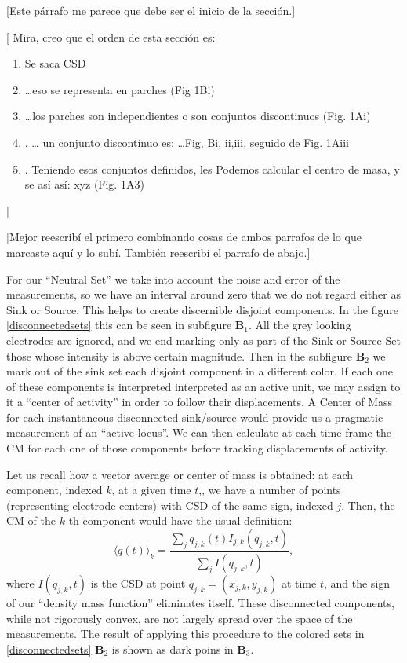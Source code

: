 \documentclass[letterpaper,12pts]{article}
\newcommand{\komment}[1]{{\color{red} [#1]}}
\newcommand{\romment}[1]{{\color{blue} [#1]}}
\newcommand{\ts}[1]{$_{\text{#1}}$}
\begin{document}
\romment{Este párrafo me parece que debe ser el inicio de la sección.}

 \romment{
   Mira, creo que el orden de esta sección es:
    \begin{enumerate}
 \item Se saca CSD
 \item …eso se representa en parches (Fig 1Bi)
 \item …los parches son independientes o son conjuntos discontinuos (Fig. 1Ai)
 \item . … un conjunto discontínuo es: …Fig, Bi, ii,iii, seguido de Fig. 1Aiii
 \item . Teniendo esos conjuntos definidos, les Podemos calcular el centro de masa, y se así así: xyz (Fig. 1A3)
   \end{enumerate}
 }

 \komment{Mejor reescribí el primero combinando cosas de ambos parrafos de lo
 que marcaste aquí y lo subí. También reescribí el parrafo de abajo.}

 For our ``Neutral Set'' we take into account the noise and error of
 the measurements, so we have an interval around zero that we do not
 regard either as Sink or Source. This helps to create discernible
 disjoint components. In the figure \ref{disconnectedsets} this can be
 seen in subfigure \textbf{B\ts{1}}. All the grey looking electrodes
 are ignored, and we end marking only as part of the Sink or Source
 Set those whose intensity is above certain magnitude.
 Then in the subfigure \textbf{B\ts{2}} we mark out of the
 sink set each disjoint component in a different color.
If each one of these components is interpreted
interpreted as an active unit,
we may assign to it a ``center of activity'' in order to follow their displacements.
A Center of Mass for each instantaneous disconnected sink/source would provide us
a pragmatic measurement of an ``active locus''. We can then calculate at each time
frame the CM for each one of those components before tracking displacements of activity.

Let us recall how a vector average or center of mass is obtained:
at each component, indexed $k$, at a given time $t$,, we have a number of points
(representing electrode centers)
with CSD of the same sign, indexed $j$. Then, the CM of the $k$-th
component would have the usual definition:
\begin{equation}\label{cmparadisj}
   \langle q(t) \rangle_k =\frac{\sum_j q_{j,k} (t) I_{j,k} (q_{j,k},t)}
           {\sum_j I(q_{j,k},t)},
\end{equation}
where $I(q_{j,k},t)$ is the CSD at point $q_{j,k}=(x_{j,k}, y_{j,k})$ at time $t$,
and the
sign of our ``density mass function'' eliminates itself.
These disconnected components, while not rigorously convex,
are not largely spread over the space of the measurements.
The result of applying this procedure to the colored sets in \ref{disconnectedsets}
\textbf{B\ts{2}} is shown as dark poins in \textbf{B\ts{3}}.
\end{document}
